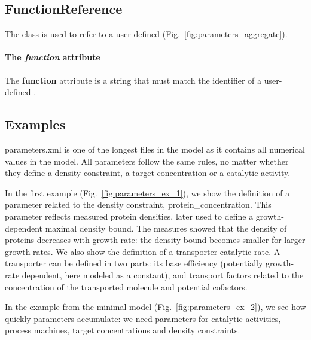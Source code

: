 \subsection{FunctionReference}
\label{sec:function_reference}

The \functionreference{} class is used to refer to a user-defined \function{}
(Fig.~\ref{fig:parameters_aggregate}).

\paragraph{The \textit{function} attribute}
The \textbf{function} attribute is a string that must match the identifier
of a user-defined \function{}.

\subsection{Examples}

parameters.xml is one of the longest files in the model as it contains
all numerical values in the model.
All parameters follow the same rules, no matter whether they define a
density constraint, a target concentration or a catalytic activity.

In the first example (Fig.~\ref{fig:parameters_ex_1}),
we show the definition of a parameter related to the density constraint,
protein\_concentration.
This parameter reflects measured protein densities,
later used to define a growth-dependent maximal density bound.
The measures showed that the density of proteins decreases with growth rate:
the density bound becomes smaller for larger growth rates.
We also show the definition of a transporter catalytic rate.
A transporter can be defined in two parts:
its base efficiency (potentially growth-rate dependent, here modeled as a constant),
and transport factors related to the concentration of the transported molecule
and potential cofactors.

In the example from the minimal model (Fig.~\ref{fig:parameters_ex_2}),
we see how quickly parameters accumulate:
we need parameters for catalytic activities, process machines,
target concentrations and density constraints.


